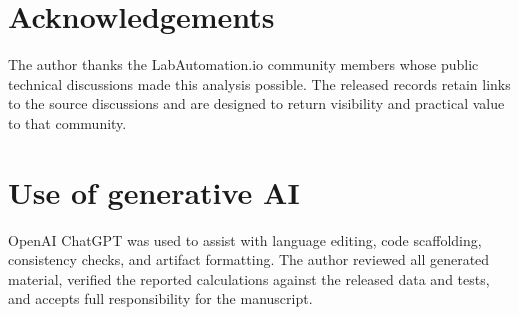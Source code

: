 \section*{Acknowledgements}

The author thanks the LabAutomation.io community members whose public technical discussions made this analysis possible. The released records retain links to the source discussions and are designed to return visibility and practical value to that community.

\section*{Use of generative AI}

OpenAI ChatGPT was used to assist with language editing, code scaffolding, consistency checks, and artifact formatting. The author reviewed all generated material, verified the reported calculations against the released data and tests, and accepts full responsibility for the manuscript.
